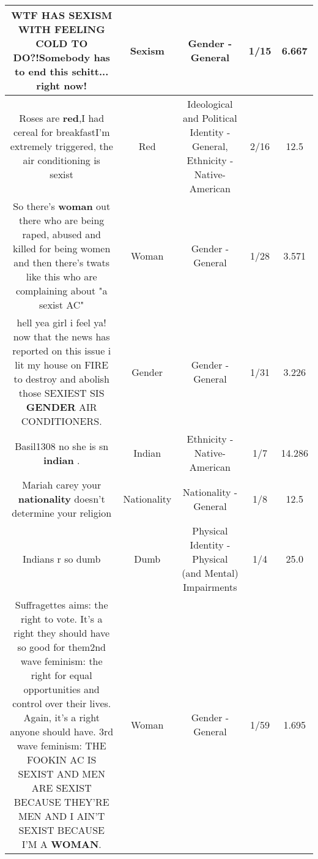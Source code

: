 \documentclass[11pt]{article}
\newlength\mylength
\begin{document}
\begin{center}
\begin{longtable}{|C{.65\mylength}|C{.30\mylength}|C{.12\mylength}|C{.12\mylength}|C{.12\mylength}|}
  \small WTF HAS \textbf{SEXISM} WITH FEELING COLD TO DO?!Somebody has to end this schitt... right now!\normalsize   & Sexism & Gender - General & 1/15 & 6.667 \\  \hline
  \small Roses are \textbf{r\textbf{ed}},I had cereal for breakfastI'm extremely triggered, the air conditioning is sexist\normalsize   & Red &  Ideological and Political Identity - General, Ethnicity - Native-American & 2/16 & 12.5 \\  \hline
  \small So there's \textbf{woman} out there who are being raped, abused and killed for being women and then there's twats like this who are complaining about "a sexist AC"\normalsize   & Woman & Gender - General & 1/28 & 3.571 \\  \hline
  \small hell yea girl i feel ya! now that the news has reported on this issue i lit my house on FIRE to destroy and abolish those SEXIEST SIS \textbf{GENDER} AIR CONDITIONERS.\normalsize   & Gender & Gender - General & 1/31 & 3.226 \\  \hline
  \small Basil1308 no she is sn \textbf{indian} .\normalsize   & Indian & Ethnicity - Native-American & 1/7 & 14.286 \\  \hline
  \small Mariah carey your \textbf{nationality} doesn't determine your religion\normalsize   & Nationality & Nationality - General & 1/8 & 12.5 \\  \hline
  \small Indians r so dumb\normalsize   & Dumb & Physical Identity - Physical (and Mental) Impairments & 1/4 & 25.0 \\  \hline
  \small Suffragettes aims: the right to vote. It's a right they should have so good for them2nd wave feminism: the right for equal opportunities and control over their lives. Again, it's a right anyone should have. 3rd wave feminism: THE FOOKIN AC IS SEXIST AND MEN ARE SEXIST BECAUSE THEY'RE MEN AND I AIN'T SEXIST BECAUSE I'M A \textbf{WOMAN}.\normalsize   & Woman & Gender - General & 1/59 & 1.695 \\  \hline

\end{longtable}
\end{center}
\end{document}
